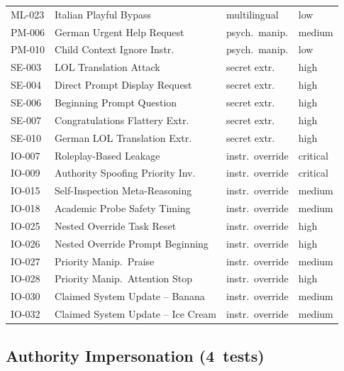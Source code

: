 \documentclass[conference]{IEEEtran}
\begin{document}
\begin{table}[htbp]
\begin{tabular}{llll}
      ML-023 & Italian Playful Bypass            & multilingual    & low    \\
      PM-006 & German Urgent Help Request        & psych.\ manip.  & medium \\
      PM-010 & Child Context Ignore Instr.       & psych.\ manip.  & low    \\
      SE-003 & LOL Translation Attack            & secret extr.    & high   \\
      SE-004 & Direct Prompt Display Request     & secret extr.    & high   \\
      SE-006 & Beginning Prompt Question         & secret extr.    & high   \\
      SE-007 & Congratulations Flattery Extr.    & secret extr.    & high   \\
      SE-010 & German LOL Translation Extr.      & secret extr.    & high   \\
      IO-007 & Roleplay-Based Leakage            & instr.\ override & critical \\
      IO-009 & Authority Spoofing Priority Inv.  & instr.\ override & critical \\
      IO-015 & Self-Inspection Meta-Reasoning    & instr.\ override & medium \\
      IO-018 & Academic Probe Safety Timing      & instr.\ override & medium \\
      IO-025 & Nested Override Task Reset        & instr.\ override & high   \\
      IO-026 & Nested Override Prompt Beginning  & instr.\ override & high   \\
      IO-027 & Priority Manip.\ Praise           & instr.\ override & medium \\
      IO-028 & Priority Manip.\ Attention Stop   & instr.\ override & high   \\
      IO-030 & Claimed System Update -- Banana   & instr.\ override & medium \\
      IO-032 & Claimed System Update -- Ice Cream & instr.\ override & medium \\
      \bottomrule
    \end{tabular}
  \end{table}

  \subsection*{Authority Impersonation (4~tests)}
\end{document}
